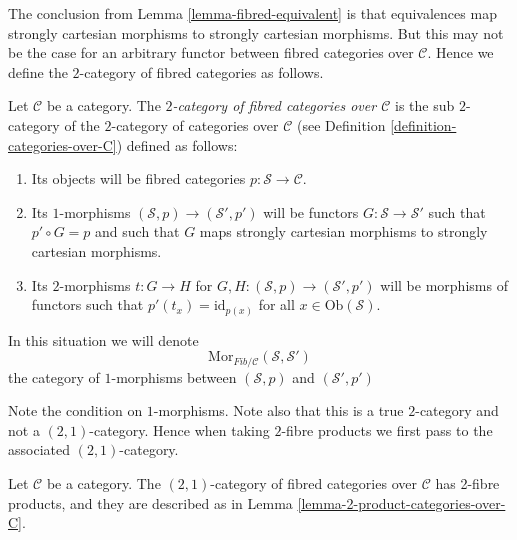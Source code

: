 \noindent
The conclusion from Lemma \ref{lemma-fibred-equivalent} is that
equivalences map strongly cartesian morphisms to strongly cartesian
morphisms. But this may not be the case for an arbitrary functor between
fibred categories over $\mathcal{C}$. Hence we define the $2$-category
of fibred categories as follows.

\begin{definition}
\label{definition-fibred-categories-over-C}
Let $\mathcal{C}$ be a category.
The {\it $2$-category of fibred categories over $\mathcal{C}$}
is the sub $2$-category of the $2$-category of categories
over $\mathcal{C}$ (see Definition \ref{definition-categories-over-C})
defined as follows:
\begin{enumerate}
\item Its objects will be fibred categories
$p : \mathcal{S} \to \mathcal{C}$.
\item Its $1$-morphisms $(\mathcal{S}, p) \to (\mathcal{S}', p')$
will be functors $G : \mathcal{S} \to \mathcal{S}'$ such that
$p' \circ G = p$ and such that $G$ maps strongly cartesian
morphisms to strongly cartesian morphisms.
\item Its $2$-morphisms $t : G \to H$ for
$G, H : (\mathcal{S}, p) \to (\mathcal{S}', p')$
will be morphisms of functors
such that $p'(t_x) = \text{id}_{p(x)}$
for all $x \in \text{Ob}(\mathcal{S})$.
\end{enumerate}
In this situation we will denote
$$
\text{Mor}_{\textit{Fib}/\mathcal{C}}(\mathcal{S}, \mathcal{S}')
$$
the category of $1$-morphisms between
$(\mathcal{S}, p)$ and $(\mathcal{S}', p')$
\end{definition}

\noindent
Note the condition on $1$-morphisms.
Note also that this is a true $2$-category and
not a $(2, 1)$-category. Hence when taking $2$-fibre
products we first pass to the associated $(2, 1)$-category.

\begin{lemma}
\label{lemma-2-product-fibred-categories-over-C}
Let $\mathcal{C}$ be a category.
The $(2, 1)$-category of fibred categories
over $\mathcal{C}$ has 2-fibre products, and
they are described as in
Lemma \ref{lemma-2-product-categories-over-C}.
\end{lemma}

